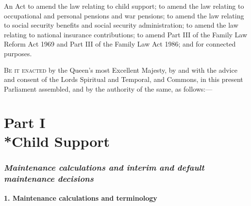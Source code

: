 \documentclass[12pt,a4paper]{article}
\title{\regstitle}
\author{2000 Chapter 19}
\date{Royal Assent
28th July 2000\\
}
\begin{document}
\maketitle

{\noindent\large
An Act to amend the law relating to child support; to amend the law relating to occupational and personal pensions and war pensions; to amend the law relating to social security benefits and social security administration; to amend the law relating to national insurance contributions; to amend Part III of the Family Law Reform Act 1969 and Part III of the Family Law Act 1986; and for connected purposes.

}

\bigskip

\lettrine{B}{e it enacted} by the Queen’s most Excellent Majesty, by and with the advice and consent of the Lords Spiritual and Temporal, and Commons, in this present Parliament assembled, and by the authority of the same, as follows:—  

{\sloppy

\tableofcontents

}

\bigskip

\setcounter{secnumdepth}{-2}

\part[Part I --- Child Support]{Part I\\*Child Support}

\renewcommand\parthead{--- Part I}

\section{\itshape Maintenance calculations and interim and default maintenance decisions}

\subsection[1. Maintenance calculations and terminology]{1. Maintenance calculations and terminology}
\end{document}
